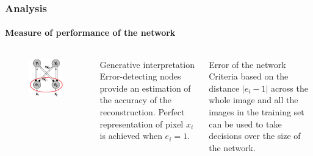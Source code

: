 \documentclass{beamer}
\begin{document}
			\begin{frame}
				\frametitle{Analysis}
				\framesubtitle{Measure of performance of the network}
				\begin{columns}[c]
					\begin{figure}[h]
						\centering
						\includegraphics[width=\textwidth]{dim_error}
					\end{figure}
					\begin{exampleblock}{Generative interpretation}
						Error-detecting nodes provide an estimation of the accuracy of the reconstruction. Perfect representation of pixel $x_i$ is achieved when $e_i = 1$.
					\end{exampleblock}
					\begin{block}{Error of the network}
						Criteria based on the distance $\left|e_i - 1\right|$ across the whole image and all the images in the training set can be used to take decisions over the size of the network.
					\end{block}
				\end{columns}
			\end{frame}
		
\end{document}
